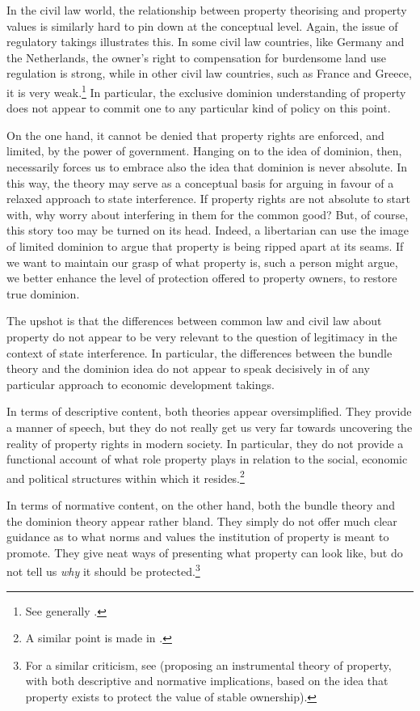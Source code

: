 In the civil law world, the relationship between property theorising and property values is similarly hard to pin down at the conceptual level. Again, the issue of regulatory takings illustrates this. In some civil law countries, like Germany and the Netherlands, the owner's right to compensation for burdensome land use regulation is strong, while in other civil law countries, such as France and Greece, it is very weak.\footnote{See generally \cite{alterman10}.} In particular, the exclusive dominion understanding of property does not appear to commit one to any particular kind of policy on this point. 

On the one hand, it cannot be denied that property rights are enforced, and limited, by the power of government. Hanging on to the idea of dominion, then, necessarily forces us to embrace also the idea that dominion is never absolute. In this way, the theory may serve as a conceptual basis for arguing in favour of a relaxed approach to state interference. If property rights are not absolute to start with, why worry about interfering in them for the common good? But, of course, this story too may be turned on its head. Indeed, a libertarian can use the image of limited dominion to argue that property is being ripped apart at its seams. If we want to maintain our grasp of what property is, such a person might argue, we better enhance the level of protection offered to property owners, to restore true dominion.

The upshot is that the differences between common law and civil law  about property do not appear to be very relevant to the question of legitimacy in the context of state interference. In particular, the differences between the bundle theory and the dominion idea do not appear to speak decisively in  of any particular approach to economic development takings.

In terms of descriptive content, both theories appear oversimplified. They provide a manner of speech, but they do not really get us very far towards uncovering the reality of property rights in modern society. In particular, they do not provide a functional account of what role property plays in relation to the social, economic and political structures within which it resides.\footnote{A similar point is made in \cite[2-6]{alexander12}.}

In terms of normative content, on the other hand, both the bundle theory and the dominion theory appear rather bland. They simply do not offer much clear guidance as to what norms and values the institution of property is meant to promote. They give neat ways of presenting what property can look like, but do not tell us {\it why} it should be protected.\footnote{For a similar criticism, see \cite[535-536]{bell05} (proposing an instrumental theory of property, with both descriptive and normative implications, based on the idea that property exists to protect the value of stable ownership).}

